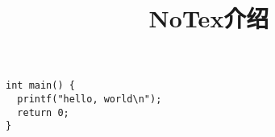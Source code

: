 \documentclass{NoTex}
\begin{document}
\title{NoTex介绍}
\maketitle

\begin{verbatim}
int main() {
  printf("hello, world\n");
  return 0;
}
\end{verbatim}
\end{document}
